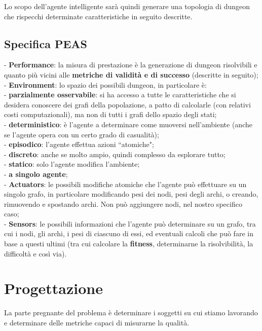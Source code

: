 \documentclass[12pt,titlepage]{article}
\begin{document}
Lo scopo dell'agente intelligente sarà quindi generare una topologia di dungeon che rispecchi determinate caratteristiche in seguito descritte.

\subsection {Specifica PEAS}

- \textbf{Performance}: la misura di prestazione è la generazione di dungeon risolvibili e quanto più vicini alle \textbf{metriche di validità e di successo} (descritte in seguito);\\
- \textbf{Environment}: lo spazio dei possibili dungeon, in particolare è:\\
\indent - \textbf{parzialmente osservabile}: si ha accesso a tutte le caratteristiche che si desidera conoscere dei grafi della popolazione, a patto di calcolarle (con relativi costi computazionali), ma non di tutti i grafi dello spazio degli stati;\\
\indent- \textbf{deterministico}: è l'agente a determinare come muoversi nell'ambiente (anche se l'agente opera con un certo grado di casualità);\\
\indent- \textbf{episodico}: l'agente effettua azioni ``atomiche";\\
\indent- \textbf{discreto}: anche se molto ampio, quindi complesso da esplorare tutto;\\
\indent- \textbf{statico}: solo l'agente modifica l'ambiente;\\
\indent- \textbf{a singolo agente};\\
- \textbf{Actuators}: le possibili modifiche atomiche che l'agente può effettuare su un singolo grafo, in particolare modificando pesi dei nodi, pesi degli archi, o creando, rimuovendo e spostando archi. Non può aggiungere nodi, nel nostro specifico caso;\\
- \textbf{Sensors}: le possibili informazioni che l'agente può determinare su un grafo, tra cui i nodi, gli archi, i pesi di ciascuno di essi, ed eventuali calcoli che può fare in base a questi ultimi (tra cui calcolare la \textbf{fitness}, determinarne la risolvibilità, la difficoltà e così via).

\section{Progettazione}

La parte pregnante del problema è determinare i soggetti su cui stiamo lavorando e determinare delle metriche capaci di misurarne la qualità.
\end{document}
